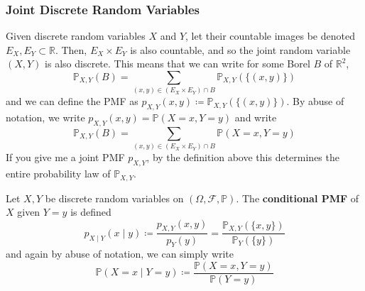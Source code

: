 \documentclass{article}
\begin{document}
    \subsubsection{Joint Discrete Random Variables}

      \begin{definition}
        Given discrete random variables $X$ and $Y$, let their countable images be denoted $E_X, E_Y \subset \mathbb{R}$. Then, $E_X \times E_Y$ is also countable, and so the joint random variable $(X, Y)$ is also discrete. This means that we can write for some Borel $B$ of $\mathbb{R}^2$, 
        \begin{equation}
          \mathbb{P}_{X, Y} (B) = \sum_{(x, y) \in (E_X \times E_Y) \cap B} \mathbb{P}_{X, Y} (\{(x, y)\})
        \end{equation}
        and we can define the PMF as $p_{X, Y} (x, y) \coloneqq \mathbb{P}_{X, Y} (\{(x, y)\})$. By abuse of notation, we write $p_{X, Y} (x, y) = \mathbb{P} (X = x, Y = y)$ and write 
        \begin{equation}
          \mathbb{P}_{X, Y} (B) = \sum_{(x, y) \in (E_X \times E_Y) \cap B} \mathbb{P} (X = x, Y = y)
        \end{equation}
        If you give me a joint PMF $p_{X, Y}$, by the definition above this determines the entire probability law of $\mathbb{P}_{X, Y}$. 
      \end{definition} 

      \begin{definition}
        Let $X, Y$ be discrete random variables on $(\Omega, \mathcal{F}, \mathbb{P})$. The \textbf{conditional PMF} of $X$ given $Y = y$ is defined 
        \begin{equation}
          p_{X \mid Y} (x \mid y) \coloneqq \frac{p_{X, Y} (x, y)}{p_Y (y)} = \frac{\mathbb{P}_{X, Y} (\{x, y\})}{\mathbb{P}_Y (\{y\})}
        \end{equation}
        and again by abuse of notation, we can simply write 
        \begin{equation}
          \mathbb{P}(X = x \mid Y = y) \coloneqq \frac{\mathbb{P}(X = x, Y = y)}{\mathbb{P}(Y = y)}
        \end{equation}
      \end{definition}
\end{document}
